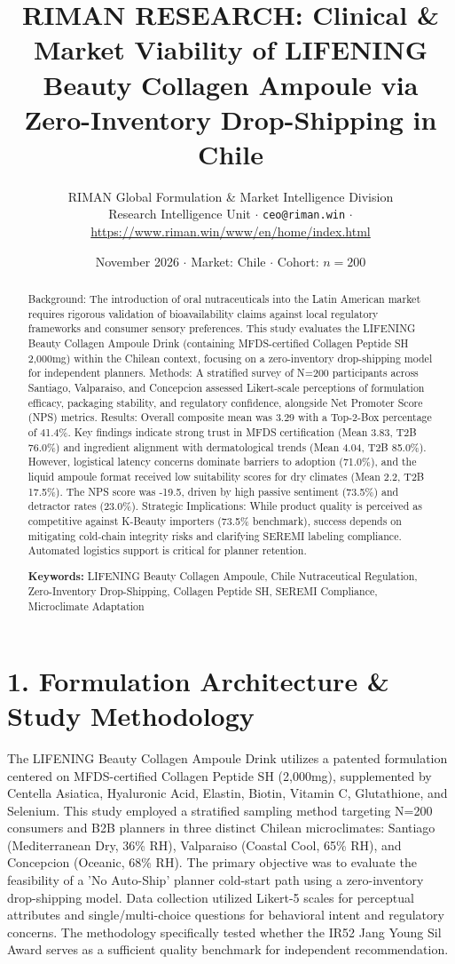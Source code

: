 \documentclass[10pt,twocolumn,a4paper]{article}
\title{\textbf{RIMAN RESEARCH: Clinical \& Market Viability of LIFENING Beauty Collagen Ampoule via Zero-Inventory Drop-Shipping in Chile}}
\author{RIMAN Global Formulation \& Market Intelligence Division\\
\small Research Intelligence Unit $\cdot$ \texttt{ceo@riman.win} $\cdot$ \url{https://www.riman.win/www/en/home/index.html}}
\date{November 2026 \quad $\cdot$ \quad Market: Chile \quad $\cdot$ \quad Cohort: $n = 200$}
\begin{document}
\maketitle

\begin{abstract}
Background: The introduction of oral nutraceuticals into the Latin American market requires rigorous validation of bioavailability claims against local regulatory frameworks and consumer sensory preferences. This study evaluates the LIFENING Beauty Collagen Ampoule Drink (containing MFDS-certified Collagen Peptide SH 2,000mg) within the Chilean context, focusing on a zero-inventory drop-shipping model for independent planners. Methods: A stratified survey of N=200 participants across Santiago, Valparaiso, and Concepcion assessed Likert-scale perceptions of formulation efficacy, packaging stability, and regulatory confidence, alongside Net Promoter Score (NPS) metrics. Results: Overall composite mean was 3.29 with a Top-2-Box percentage of 41.4\%. Key findings indicate strong trust in MFDS certification (Mean 3.83, T2B 76.0\%) and ingredient alignment with dermatological trends (Mean 4.04, T2B 85.0\%). However, logistical latency concerns dominate barriers to adoption (71.0\%), and the liquid ampoule format received low suitability scores for dry climates (Mean 2.2, T2B 17.5\%). The NPS score was -19.5, driven by high passive sentiment (73.5\%) and detractor rates (23.0\%). Strategic Implications: While product quality is perceived as competitive against K-Beauty importers (73.5\% benchmark), success depends on mitigating cold-chain integrity risks and clarifying SEREMI labeling compliance. Automated logistics support is critical for planner retention.

\vspace{0.4em}
\noindent\textbf{Keywords:} LIFENING Beauty Collagen Ampoule, Chile Nutraceutical Regulation, Zero-Inventory Drop-Shipping, Collagen Peptide SH, SEREMI Compliance, Microclimate Adaptation
\end{abstract}

\section{1. Formulation Architecture \& Study Methodology}
The LIFENING Beauty Collagen Ampoule Drink utilizes a patented formulation centered on MFDS-certified Collagen Peptide SH (2,000mg), supplemented by Centella Asiatica, Hyaluronic Acid, Elastin, Biotin, Vitamin C, Glutathione, and Selenium. This study employed a stratified sampling method targeting N=200 consumers and B2B planners in three distinct Chilean microclimates: Santiago (Mediterranean Dry, 36\% RH), Valparaiso (Coastal Cool, 65\% RH), and Concepcion (Oceanic, 68\% RH). The primary objective was to evaluate the feasibility of a 'No Auto-Ship' planner cold-start path using a zero-inventory drop-shipping model. Data collection utilized Likert-5 scales for perceptual attributes and single/multi-choice questions for behavioral intent and regulatory concerns. The methodology specifically tested whether the IR52 Jang Young Sil Award serves as a sufficient quality benchmark for independent recommendation.
\end{document}
